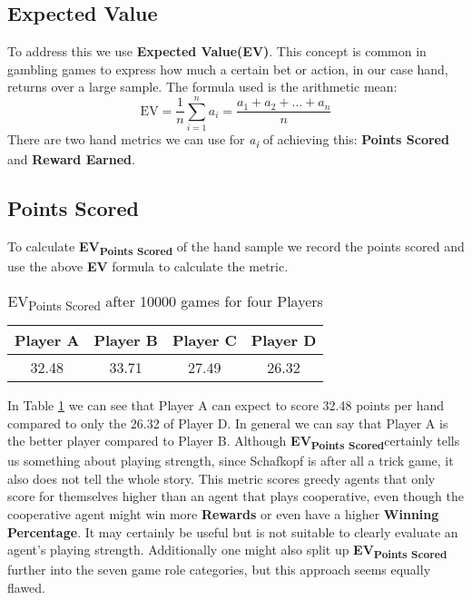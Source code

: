 \subsection{Expected Value}
To address this we use \textbf{Expected Value(EV)}.
This concept is common in gambling games to express how much a certain bet or action, in our case hand, returns over
a large sample.
The formula used is the arithmetic mean:
\[ \text{EV} = \frac{1}{n} \sum_{i=1}^{n}a_{i} = \frac{a_{1} + a_{2} + ...+a_{n}}{n} \]
There are two hand metrics we can use for \textit{a\textsubscript{i}} of achieving this: \textbf{Points Scored} and
\textbf{Reward Earned}.

\subsection{Points Scored}
To calculate \textbf{EV\textsubscript{Points Scored}} of the hand sample we record the points scored and use the
above \textbf{EV} formula to calculate the metric.
\newline
\begin{table}[!h]
\centering
\begin{tabular}{cccc}
\toprule
Player A &  Player B &  Player C &  Player D\\
\midrule
32.48 & 33.71 & 27.49 & 26.32 \\
\bottomrule
\end{tabular}
\caption{EV\textsubscript{Points Scored} after 10000 games for four Players}
\label{tab:evscorestable}
\end{table}
\newline
In Table \ref{tab:evscorestable} we can see that Player A can expect to score 32.48 points per hand compared to only
the 26.32 of Player D.
In general we can say that Player A is the better player compared to Player B.
\newline
Although \textbf{EV\textsubscript{Points Scored}}certainly tells us something about playing strength, since Schafkopf
is after all a trick game, it also does not tell the whole story.
This metric scores greedy agents that only score for themselves higher than an agent that plays cooperative, even
though the cooperative agent might win more \textbf{Rewards} or even have a higher \textbf{Winning Percentage}.
\newline
It may certainly be useful but is not suitable to clearly evaluate an agent's playing strength.
Additionally one might also split up \textbf{EV\textsubscript{Points Scored}} further into the seven game role
categories, but this approach seems equally flawed.

